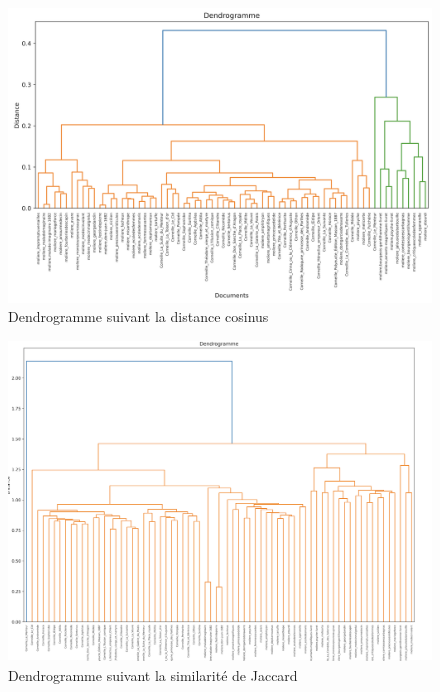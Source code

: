 \newpage
\begin{figure}[htbp]
  \centering
  \includegraphics[width=15cm]{Ressources/Dendo_cos.png}
  \caption{Dendrogramme suivant la distance cosinus}
  \label{fig:images}
\end{figure}

\newpage
\begin{figure}[htbp]
  \centering
  \includegraphics[width=15cm]{Ressources/Dendo_Jacard.png}
  \caption{Dendrogramme suivant la similarité de Jaccard}
  \label{fig:images}
\end{figure}

\newpage

